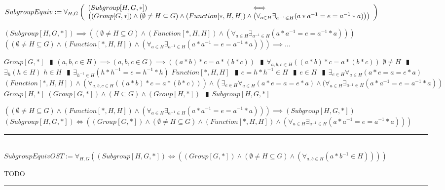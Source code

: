 \documentclass{book}
\newcommand{\abr}{:=}
\newcommand{\pipe}{$\phantom{(}\vrectangleblack\phantom{)}$}
\newcommand{\pr}[1]{\left(#1\right)}
\begin{document}
$SubgroupEquiv \abr \forall_{H, G}\left(\begin{array}{ll}
  (Subgroup[H, G, *]) \hfill \iff \hfill \\
  \pr{(Group[G, *]) \land (\emptyset \neq H \subseteq G) \land (Function[*, H, H]) \land \pr{\forall_{a \in H} \exists_{a^{-1} \in H}(a * a^{-1} = e = a^{-1} * a)}}
\end{array}\right)$
\begin{enumerate}
  \lit $(Subgroup[H, G, *]) \implies \pr{(\emptyset \neq H \subseteq G) \land (Function[*, H, H]) \land \pr{\forall_{a \in H} \exists_{a^{-1} \in H}(a * a^{-1} = e = a^{-1} * a)}}$
  \lit $\pr{(\emptyset \neq H \subseteq G) \land (Function[*, H, H]) \land \pr{\forall_{a \in H} \exists_{a^{-1} \in H}(a * a^{-1} = e = a^{-1} * a)}} \implies \ldots$
  \begin{enumerate}
    \lit $Group[G, *]$ \pipe $(a, b, c \in H) \implies (a, b, c \in G) \implies \pr{(a * b) * c = a * (b * c)}$ \pipe $\forall_{a, b, c \in H}\pr{(a * b) * c = a * (b * c)}$
    \lit $\emptyset \neq H$ \pipe $\exists_{h}(h \in H)$
    \lit $h \in H$ \pipe $\exists_{h^{-1} \in H}(h * h^{-1} = e = h^{-1} * h)$
    \lit $Function[*, H, H]$ \pipe $e = h * h^{-1} \in H$ \pipe $e \in H$ \pipe $\exists_{e \in H} \forall_{a \in H}(a * e = a = e * a)$
    \lit $(Function[*, H, H]) \land \pr{\forall_{a, b, c \in H}\pr{(a * b) * c = a * (b * c)}} \land \pr{\exists_{e \in H} \forall_{a \in H}(a * e = a = e * a) \land (\forall_{a \in H} \exists_{a^{-1} \in H}(a * a^{-1} = e = a^{-1} * a)}$
    \lit $Group[H, *]$
    \lit $(Group[G, *]) \land (H \subseteq G) \land (Group[H, *])$ \pipe $Subgroup[H, G, *]$
  \end{enumerate}
  \lit $\pr{(\emptyset \neq H \subseteq G) \land (Function[*, H, H]) \land \pr{\forall_{a \in H} \exists_{a^{-1} \in H}(a * a^{-1} = e = a^{-1} * a)}} \implies (Subgroup[H, G, *])$
  \lit $(Subgroup[H, G, *]) \iff \pr{(Group[G, *]) \land (\emptyset \neq H \subseteq G) \land (Function[*, H, H]) \land \pr{\forall_{a \in H} \exists_{a^{-1} \in H}(a * a^{-1} = e = a^{-1} * a)}}$
\end{enumerate} \vspace{.75mm} \hrule \vspace{.75mm} \ \\ 

$SubgroupEquivOST \abr \forall_{H, G}\pr{(Subgroup[H, G, *]) \iff \pr{(Group[G, *]) \land (\emptyset \neq H \subseteq G) \land \pr{\forall_{a, b \in H}(a * b^{-1} \in H)}}}$
\begin{enumerate}
  \lit TODO
\end{enumerate} \vspace{.75mm} \hrule \vspace{.75mm} \ \\ 
\end{document}

